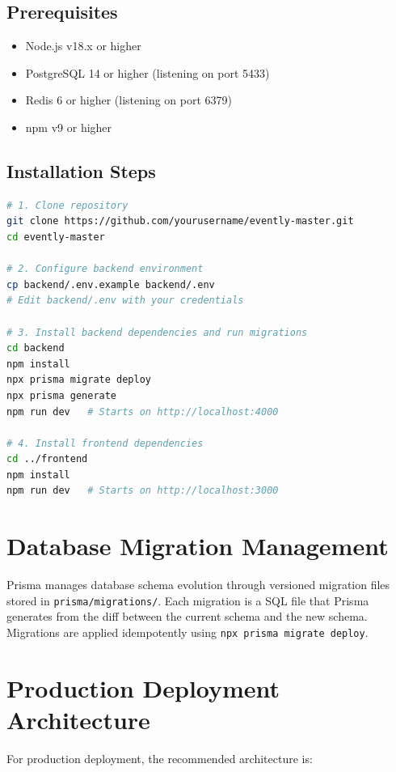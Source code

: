 \documentclass[12pt,a4paper]{report}
\begin{document}
\subsection{Prerequisites}
\begin{itemize}[leftmargin=2em]
    \item Node.js v18.x or higher
    \item PostgreSQL 14 or higher (listening on port 5433)
    \item Redis 6 or higher (listening on port 6379)
    \item npm v9 or higher
\end{itemize}

\subsection{Installation Steps}
\begin{lstlisting}[language=bash, caption=Local Development Setup Commands]
# 1. Clone repository
git clone https://github.com/yourusername/evently-master.git
cd evently-master

# 2. Configure backend environment
cp backend/.env.example backend/.env
# Edit backend/.env with your credentials

# 3. Install backend dependencies and run migrations
cd backend
npm install
npx prisma migrate deploy
npx prisma generate
npm run dev   # Starts on http://localhost:4000

# 4. Install frontend dependencies
cd ../frontend
npm install
npm run dev   # Starts on http://localhost:3000
\end{lstlisting}

\section{Database Migration Management}
Prisma manages database schema evolution through versioned migration files stored in \texttt{prisma/migrations/}. Each migration is a SQL file that Prisma generates from the diff between the current schema and the new schema. Migrations are applied idempotently using \texttt{npx prisma migrate deploy}.

\section{Production Deployment Architecture}

For production deployment, the recommended architecture is:
\end{document}
